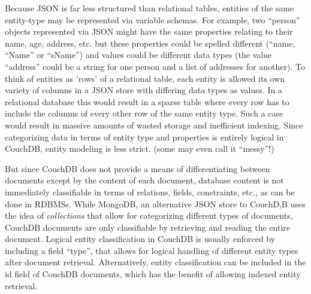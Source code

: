 Because JSON is far less structured than relational tables, entities of the same entity-type may be represented via variable schemas. For example, two ``person'' objects represented via JSON might have the same properties relating to their name, age, address, etc. but these properties could be spelled different (``name, ``Name'' or ``sName'') and values could be different data types (the value ``address'' could be a string for one person and a list of addresses for another). To think of entities as 'rows' of a relational table, each entity is allowed its own variety of columns in a JSON store with differing data types as values. In a relational database this would result in a sparse table where every row has to include the columns of every other row of the same entity type. Such a case would result in massive amounts of wasted storage and inefficient indexing. Since categorizing data in terms of entity type and properties is entirely logical in CouchDB, entity modeling is less strict. (some may even call it ``messy''!)

But since CouchDB does not provide a means of differentiating between documents except by the content of each document, database content is not immediately classifiable in terms of relations, fields, constraints, etc., as can be done in RDBMSs. While MongoDB, an alternative JSON store to CouchD,B uses the idea of \textit{collections} that allow for categorizing different types of documents, CouchDB documents are only classifiable by retrieving and reading the entire document. Logical entity classification in CouchDB is usually enforced by including a field ``type'', that allows for logical handling of different entity types after document retrieval. Alternatively, entity classification can be included in the id field of CouchDB documents, which has the benefit of allowing indexed entity retrieval.